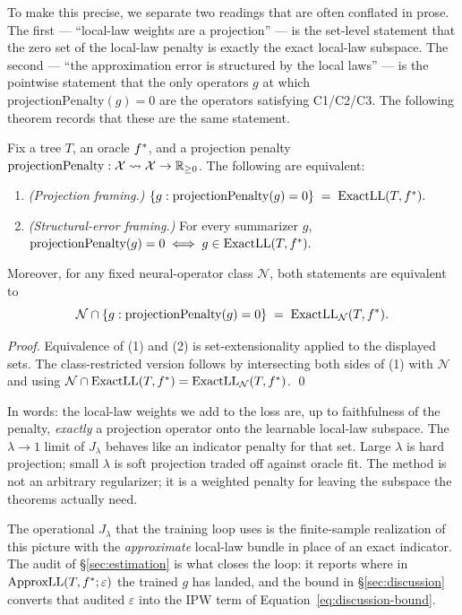To make this precise, we separate two readings that are often conflated
in prose. The first --- ``local-law weights are a projection'' --- is
the set-level statement that the zero set of the local-law penalty is
exactly the exact local-law subspace. The second --- ``the
approximation error is structured by the local laws'' --- is the
pointwise statement that the only operators $g$ at which
$\mathrm{projectionPenalty}(g) = 0$ are the operators satisfying
C1/C2/C3. The following theorem records that these are the same
statement.

\begin{theorem}\label{thm:projection-iff}
Fix a tree $T$, an oracle $f^\ast$, and a projection penalty
$\mathrm{projectionPenalty} : \mathcal{X}\rightsquigarrow\mathcal{X}\to\mathbb{R}_{\ge 0}$.
The following are equivalent:
\begin{enumerate}[leftmargin=1.5em,nosep]
\item \emph{(Projection framing.)}
$\{g : \mathrm{projectionPenalty}(g) = 0\} \;=\; \mathrm{ExactLL}(T,f^\ast).$
\item \emph{(Structural-error framing.)} For every summarizer $g$,
$\mathrm{projectionPenalty}(g) = 0 \iff g \in \mathrm{ExactLL}(T,f^\ast).$
\end{enumerate}
Moreover, for any fixed neural-operator class $\mathcal{N}$, both statements are
equivalent to
\[
\mathcal{N} \cap \{g : \mathrm{projectionPenalty}(g) = 0\}
  \;=\;
  \mathrm{ExactLL}_{\mathcal{N}}(T,f^\ast).
\]
\end{theorem}

\noindent\emph{Proof.} Equivalence of (1) and (2) is set-extensionality
applied to the displayed sets. The class-restricted version follows by
intersecting both sides of (1) with $\mathcal{N}$ and using
$\mathcal{N}\cap\mathrm{ExactLL}(T,f^\ast)=\mathrm{ExactLL}_{\mathcal{N}}(T,f^\ast)$.
\qed

\medskip
In words: the local-law weights we add to the loss are, up to
faithfulness of the penalty, \emph{exactly} a projection operator onto
the learnable local-law subspace. The $\lambda\to 1$ limit of
$J_\lambda$ behaves like an indicator penalty for that set. Large
$\lambda$ is hard projection; small $\lambda$ is soft projection traded
off against oracle fit. The method is not an arbitrary regularizer; it
is a weighted penalty for leaving the subspace the theorems actually
need.

The operational $J_\lambda$ that the training loop uses is the
finite-sample realization of this picture with the \emph{approximate}
local-law bundle in place of an exact indicator. The audit of
\S\ref{sec:estimation} is what closes the loop: it reports where in
$\mathrm{ApproxLL}(T,f^\ast;\varepsilon)$ the trained $g$ has landed,
and the bound in \S\ref{sec:discussion} converts that audited
$\varepsilon$ into the IPW term of Equation~\eqref{eq:discussion-bound}.

